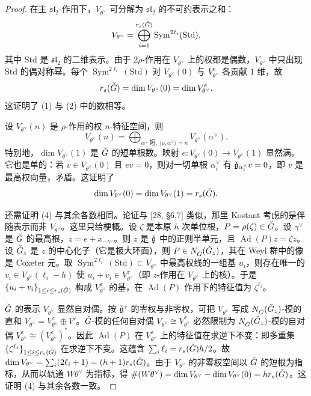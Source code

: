 \begin{proof}
在主 $\mathfrak{sl}_2$-作用下，$V_{\theta^\vee}$ 可分解为 $\mathfrak{sl}_2$ 的不可约表示之和：
\[
V_{\theta^\vee}=\bigoplus_{i=1}^{r_s(\check G)}\operatorname{Sym}^{2\ell_i}(\mathrm{Std}),
\]
其中 $\mathrm{Std}$ 是 $\mathfrak{sl}_2$ 的二维表示。由于 $2\rho$-作用在 $V_{\theta^\vee}$ 上的权都是偶数，$V_{\theta^\vee}$ 中只出现 $\mathrm{Std}$ 的偶对称幂。每个 $\operatorname{Sym}^{2\ell_i}(\mathrm{Std})$ 对 $V_{\theta^\vee}(0)$ 与 $V^e_{\theta^\vee}$ 各贡献 $1$ 维，故
\[
r_s(\check G)=\dim V_{\theta^\vee}(0)=\dim V^e_{\theta^\vee}.
\]
这证明了 (1) 与 (2) 中的数相等。

设 $V_{\theta^\vee}(n)$ 是 $\rho$-作用的权 $n$-特征空间，则
\[
V_{\theta^\vee}(n)=\bigoplus_{\alpha^\vee\ \text{短},\ \langle\rho,\alpha^\vee\rangle=n}V_{\theta^\vee}(\alpha^\vee).
\]
特别地，$\dim V_{\theta^\vee}(1)$ 是 $\check G$ 的短单根数。映射 $e:V_{\theta^\vee}(0)\to V_{\theta^\vee}(1)$ 显然满。它也是单的：若 $v\in V_{\theta^\vee}(0)$ 且 $ev=0$，则对一切单根 $\alpha_i^\vee$ 有 $\check{\mathfrak g}_{\alpha_i^\vee}v=0$，即 $v$ 是最高权向量，矛盾。这证明了
\begin{equation}
\dim V_{\theta^\vee}(0)=\dim V_{\theta^\vee}(1)=r_s(\check G).
\end{equation}

还需证明 (4) 与其余各数相同。论证与 [28, §6.7] 类似，那里 Kostant 考虑的是伴随表示而非 $V_{\theta^\vee}$。这里只给梗概。设 $\zeta$ 是本原 $h$ 次单位根，$P=\rho(\zeta)\in\check G$。设 $\gamma^\vee$ 是 $\check G$ 的最高根，$z=e+x_{-\gamma^\vee}$。则 $z$ 是 $\check{\mathfrak g}$ 中的正则半单元，且 $\operatorname{Ad}(P)z=\zeta z$。设 $\check G_z$ 是 $z$ 的中心化子（它是极大环面），则 $P\in N_{\check G}(\check G_z)$，其在 Weyl 群中的像是 Coxeter 元。取 $\operatorname{Sym}^{2\ell_i}(\mathrm{Std})\subset V_{\theta^\vee}$ 中最高权线的一组基 $u_i$，则存在唯一的 $v_i\in V_{\theta^\vee}(\ell_i-h)$ 使 $u_i+v_i\in V^z_{\theta^\vee}$（即 $z$-作用在 $V_{\theta^\vee}$ 上的核）。于是 $\{u_i+v_i\}_{1\le i\le r_s(\check G)}$ 构成 $V^z_{\theta^\vee}$ 的基，在 $\operatorname{Ad}(P)$ 作用下的特征值为 $\zeta^{\ell_i}$。

$\check G$ 的表示 $V_{\theta^\vee}$ 显然自对偶。按 $\check{\mathfrak g}^z$ 的零权与非零权，可把 $V_{\theta^\vee}$ 写成 $N_{\check G}(\check G_z)$-模的直和 $V_{\theta^\vee}=V^z_{\theta^\vee}\oplus V'$。$\check G$-模的任何自对偶 $V_{\theta^\vee}\cong V^*_{\theta^\vee}$ 必然限制为 $N_{\check G}(\check G_z)$-模的自对偶 $V^z_{\theta^\vee}\cong(V^z_{\theta^\vee})^*$。因此 $\operatorname{Ad}(P)$ 在 $V^z_{\theta^\vee}$ 上的特征值在求逆下不变：即多重集 $\{\zeta^{\ell_i}\}_{1\le i\le r_s(\check G)}$ 在求逆下不变。这蕴含 $\sum_i\ell_i=r_s(\check G)h/2$。故 $\dim V_{\theta^\vee}=\sum_i(2\ell_i+1)=(h+1)r_s(\check G)$。由于 $V_{\theta^\vee}$ 的非零权空间以 $\check G$ 的短根为指标，从而以轨道 $W\theta^\vee$ 为指标，得 $\#(W\theta^\vee)=\dim V_{\theta^\vee}-\dim V_{\theta^\vee}(0)=hr_s(\check G)$。这证明 (4) 与其余各数一致。
\end{proof}

